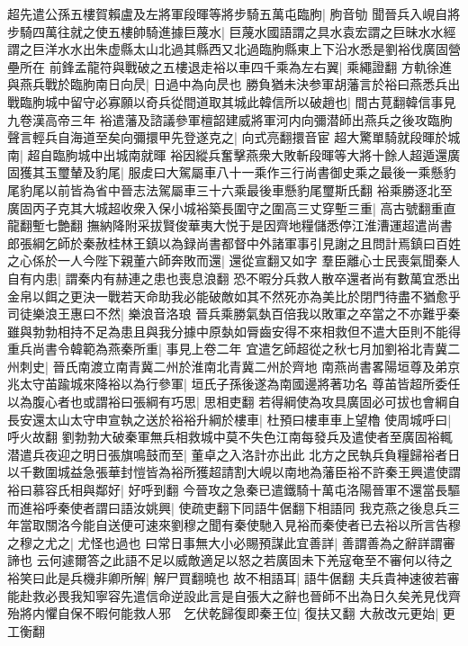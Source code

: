 超先遣公孫五樓賀賴盧及左將軍段暉等將步騎五萬屯臨朐|{
	朐音劬}
聞晉兵入峴自將步騎四萬往就之使五樓帥騎進據巨蔑水|{
	巨蔑水國語謂之具水袁宏謂之巨昧水水經謂之巨洋水水出朱虚縣太山北過其縣西又北過臨朐縣東上下沿水悉是劉裕伐廣固營壘所在}
前鋒孟龍符與戰破之五樓退走裕以車四千乘為左右翼|{
	乘繩證翻}
方軌徐進與燕兵戰於臨朐南日向昃|{
	日過中為向昃也}
勝負猶未決参軍胡藩言於裕曰燕悉兵出戰臨朐城中留守必寡願以奇兵從間道取其城此韓信所以破趙也|{
	間古莧翻韓信事見九卷漢高帝三年}
裕遣藩及諮議參軍檀韶建威將軍河内向彌潜師出燕兵之後攻臨朐聲言輕兵自海道至矣向彌擐甲先登遂克之|{
	向式亮翻擐音宦}
超大驚單騎就段暉於城南|{
	超自臨胊城中出城南就暉}
裕因縱兵奮擊燕衆大敗斬段暉等大將十餘人超遁還廣固獲其玉璽輦及豹尾|{
	服䖍曰大駕屬車八十一乘作三行尚書御史乘之最後一乘懸豹尾豹尾以前皆為省中晉志法駕屬車三十六乘最後車懸豹尾璽斯氏翻}
裕乘勝逐北至廣固丙子克其大城超收衆入保小城裕築長圍守之圍高三丈穿塹三重|{
	高古號翻重直龍翻塹七艶翻}
撫納降附采拔賢俊華夷大悦于是因齊地糧儲悉停江淮漕運超遣尚書郎張綱乞師於秦赦桂林王鎮以為録尚書都督中外諸軍事引見謝之且問計焉鎮曰百姓之心係於一人今陛下親董六師奔敗而還|{
	還從宣翻又如字}
羣臣離心士民喪氣聞秦人自有内患|{
	謂秦内有赫連之患也喪息浪翻}
恐不暇分兵救人散卒還者尚有數萬宜悉出金帛以餌之更決一戰若天命助我必能破敵如其不然死亦為美比於閉門待盡不猶愈乎司徒樂浪王惠曰不然|{
	樂浪音洛琅}
晉兵乘勝氣埶百倍我以敗軍之卒當之不亦難乎秦雖與勃勃相持不足為患且與我分據中原埶如脣齒安得不來相救但不遣大臣則不能得重兵尚書令韓範為燕秦所重|{
	事見上卷二年}
宜遣乞師超從之秋七月加劉裕北青冀二州刺史|{
	晉氏南渡立南青冀二州於淮南北青冀二州於齊地}
南燕尚書畧陽垣尊及弟京兆太守苖踰城來降裕以為行參軍|{
	垣氏子孫後遂為南國邊將著功名}
尊苖皆超所委任以為腹心者也或謂裕曰張綱有巧思|{
	思相吏翻}
若得綱使為攻具廣固必可拔也會綱自長安還太山太守申宣執之送於裕裕升綱於樓車|{
	杜預曰樓車車上望櫓}
使周城呼曰|{
	呼火故翻}
劉勃勃大破秦軍無兵相救城中莫不失色江南每發兵及遣使者至廣固裕輒潜遣兵夜迎之明日張旗鳴鼓而至|{
	董卓之入洛計亦出此}
北方之民執兵負糧歸裕者日以千數圍城益急張華封愷皆為裕所獲超請割大峴以南地為藩臣裕不許秦王興遣使謂裕曰慕容氏相與鄰好|{
	好呼到翻}
今晉攻之急秦已遣鐵騎十萬屯洛陽晉軍不還當長驅而進裕呼秦使者謂曰語汝姚興|{
	使疏吏翻下同語牛倨翻下相語同}
我克燕之後息兵三年當取關洛今能自送便可速來劉穆之聞有秦使馳入見裕而秦使者已去裕以所言告穆之穆之尤之|{
	尤怪也過也}
曰常日事無大小必賜預謀此宜善詳|{
	善謂善為之辭詳謂審諦也}
云何遽爾答之此語不足以威敵適足以怒之若廣固未下羌寇奄至不審何以待之裕笑曰此是兵機非卿所解|{
	解尸買翻曉也}
故不相語耳|{
	語牛倨翻}
夫兵貴神速彼若審能赴救必畏我知寧容先遣信命逆設此言是自張大之辭也晉師不出為日久矣羌見伐齊殆將内懼自保不暇何能救人邪　乞伏乾歸復即秦王位|{
	復扶又翻}
大赦改元更始|{
	更工衡翻}
